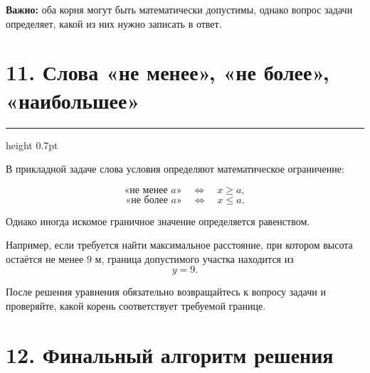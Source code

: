 \documentclass[a4paper,12pt]{article}
\newcommand{\sectionline}{%
    \par\vspace{0.15em}
    {\color{lightaccent}\hrule height 0.7pt}
    \vspace{0.7em}
}
\newcommand{\key}[1]{\textcolor{darkaccent}{\textbf{#1}}}
\begin{document}
\begin{center}
\end{center}

\key{Важно:} оба корня могут быть математически допустимы, однако вопрос
задачи определяет, какой из них нужно записать в ответ.

\section*{\textcolor{darkaccent}{11. Слова «не менее», «не более», «наибольшее»}}

\sectionline

В прикладной задаче слова условия определяют математическое ограничение:

\[
\text{«не менее }a\text{»}
\quad\Longleftrightarrow\quad
x\ge a,
\]
\[
\text{«не более }a\text{»}
\quad\Longleftrightarrow\quad
x\le a.
\]

Однако иногда искомое граничное значение определяется равенством.

Например, если требуется найти максимальное расстояние, при котором высота
остаётся не менее \(9\) м, граница допустимого участка находится из
\[
y=9.
\]

После решения уравнения обязательно возвращайтесь к вопросу задачи и
проверяйте, какой корень соответствует требуемой границе.

\section*{\textcolor{darkaccent}{12. Финальный алгоритм решения}}
\end{document}

